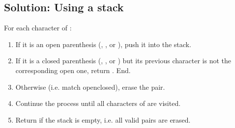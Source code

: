 \documentclass[letterpaper,12pt,english]{book}
\begin{document}
\subsection{Solution: Using a stack}
\label{\detokenize{Stack/20_Valid_Parentheses:solution-using-a-stack}}
\sphinxAtStartPar
For each character  of :
\begin{enumerate}
%
\item {} 
\sphinxAtStartPar
If it is an open parenthesis (\sphinxcode{\sphinxupquote{\textquotesingle{}(\textquotesingle{}}}, \sphinxcode{\sphinxupquote{\textquotesingle{}\{\textquotesingle{}}}, or \sphinxcode{\sphinxupquote{\textquotesingle{}{[}\textquotesingle{}}}), push it into the stack.

\item {} 
\sphinxAtStartPar
If it is a closed parenthesis (\sphinxcode{\sphinxupquote{\textquotesingle{})\textquotesingle{}}}, \sphinxcode{\sphinxupquote{\textquotesingle{}\}\textquotesingle{}}}, or \sphinxcode{\sphinxupquote{\textquotesingle{}{]}\textquotesingle{}}}) but its previous character is not the corresponding open one, return . End.

\item {} 
\sphinxAtStartPar
Otherwise (i.e. match open\sphinxhyphen{}closed), erase the pair.

\item {} 
\sphinxAtStartPar
Continue the process until all characters of  are visited.

\item {} 
\sphinxAtStartPar
Return  if the stack is empty, i.e. all valid pairs are erased.

\end{enumerate}
\end{document}
